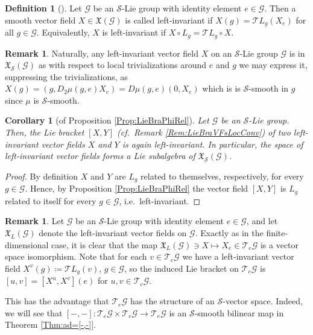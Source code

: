 \documentclass[12pt,a4paper]{article}
\theoremstyle{plain}
\newtheorem{corollary}[theorem]{Corollary}
\theoremstyle{definition}
\newtheorem{definition}[theorem]{Definition}
\newtheorem{remark}[theorem]{Remark}
\newcommand{\Scal}{\mathcal{S}}
\newcommand{\Gcal}{\mathcal{G}}
\begin{document}
\begin{definition}[{\cite[Definition III.1.5]{InfDimLieneeb}}]
Let $\Gcal$ be an $\Scal$-Lie group with identity element $e\in \Gcal$. Then a smooth vector field $X\in \mathfrak{X}(\Gcal)$ is called left-invariant if $X(g)=\mathcal{T}L_g(X_e)$ for all $g\in\Gcal$. Equivalently, $X$ is left-invariant if $X\circ L_g=\mathcal{T}L_g\circ X$.
\end{definition}

\begin{remark}
Naturally, any left-invariant vector field $X$ on an $\Scal$-Lie group $\Gcal$ is in $\mathfrak{X}_\Scal(\Gcal)$ as with respect to local trivializations around $e$ and $g$ we may express it, suppressing the trivializations, as $X(g)=(g,D_2\mu(g,e)X_e)=D\mu(g,e)(0,X_e)$ which is is $\Scal$-smooth in $g$ since $\mu$ is $\Scal$-smooth.
\end{remark}

\begin{corollary}[of Proposition \ref{Prop:LieBraPhiRel}]
Let $\Gcal$ be an $\Scal$-Lie group. Then, the Lie bracket $[X,Y]$ (cf.~Remark \ref{Rem:LieBraVFsLocConv}) of two left-invariant vector fields $X$ and $Y$ is again left-invariant. In particular, the space of left-invariant vector fields forms a Lie subalgebra of $\mathfrak{X}_\Scal(\Gcal)$.    
\end{corollary}
\begin{proof}
By definition $X$ and $Y$ are $L_g$ related to themselves, respectively, for every $g\in \Gcal$. Hence, by Proposition \ref{Prop:LieBraPhiRel} the vector field $[X,Y]$ is $L_g$ related to itself for every $g\in \Gcal$, i.e.~left-invariant.
\end{proof}


\begin{remark}
\label{Rem:TeGLieAlg}
Let $\Gcal$ be an $\Scal$-Lie group with identity element $e\in \Gcal$, and let $\mathfrak{X}_L(\Gcal)$ denote the left-invariant vector fields on $\Gcal$. Exactly as in the finite-dimensional case, it is clear that the map $\mathfrak{X}_L(\Gcal)\ni X\mapsto X_e\in \mathcal T_e\Gcal$ is a vector space isomorphism. Note that for each $v\in \mathcal{T}_e\Gcal$ we have a left-invariant vector field $X^v(g)\coloneqq \mathcal{T}L_g(v)$, $g\in \Gcal$, so the induced Lie bracket on $\mathcal{T}_e\Gcal$ is $[u,v]=[X^u,X^v](e)$ for $u,v \in \mathcal T_e\Gcal$. 

This has the advantage that $\mathcal T_e\Gcal$ has the structure of an $\Scal$-vector space. Indeed, we will see that $[-,-]:\mathcal T_e\Gcal\times \mathcal T_e\Gcal\to \mathcal T_e\Gcal$ is an $\Scal$-smooth bilinear map in Theorem \ref{Thm:ad=[-,-]}.
\end{remark}
\end{document}
